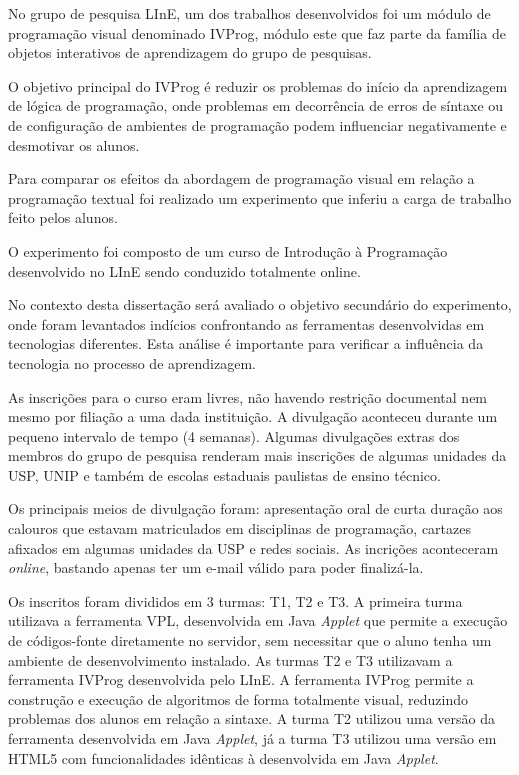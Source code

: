 No grupo de pesquisa LInE, um dos trabalhos desenvolvidos foi um módulo de programação visual denominado IVProg, módulo este que faz parte da família de objetos interativos de aprendizagem do grupo de pesquisas.

O objetivo principal do IVProg é reduzir os problemas do início da aprendizagem de lógica de programação, onde problemas em decorrência de erros de síntaxe ou de configuração de ambientes de programação podem influenciar negativamente e desmotivar os alunos.

Para comparar os efeitos da abordagem de programação visual em relação a programação textual foi realizado um experimento que inferiu a carga de trabalho feito pelos alunos.

O experimento foi composto de um curso de Introdução à Programação desenvolvido no LInE sendo conduzido totalmente online.

No contexto desta dissertação será avaliado o objetivo secundário do experimento, onde foram levantados indícios confrontando as ferramentas desenvolvidas em tecnologias diferentes. Esta análise é importante para verificar a influência da tecnologia no processo de aprendizagem.

As inscrições para o curso eram livres, não havendo restrição documental nem mesmo por filiação a uma dada instituição. A divulgação aconteceu durante um pequeno intervalo de tempo (4 semanas). Algumas divulgações extras dos membros do grupo de pesquisa renderam mais inscrições de algumas unidades da USP, UNIP e também de escolas estaduais paulistas de ensino técnico.

Os principais meios de divulgação foram: apresentação oral de curta duração aos calouros que estavam matriculados em disciplinas de programação, cartazes afixados em algumas unidades da USP e redes sociais. As incrições aconteceram \emph{online}, bastando apenas ter um e-mail válido para poder finalizá-la.

Os inscritos foram divididos em 3 turmas: T1, T2 e T3. A primeira turma utilizava a ferramenta VPL, desenvolvida em Java \emph{Applet} que permite a execução de códigos-fonte diretamente no servidor, sem necessitar que o aluno tenha um ambiente de desenvolvimento instalado. As turmas T2 e T3 utilizavam a ferramenta IVProg desenvolvida pelo LInE. A ferramenta IVProg permite a construção e execução de algoritmos de forma totalmente visual, reduzindo problemas dos alunos em relação a sintaxe. A turma T2 utilizou uma versão da ferramenta desenvolvida em Java \emph{Applet}, já a turma T3 utilizou uma versão em HTML5 com funcionalidades idênticas à desenvolvida em Java \emph{Applet}.

